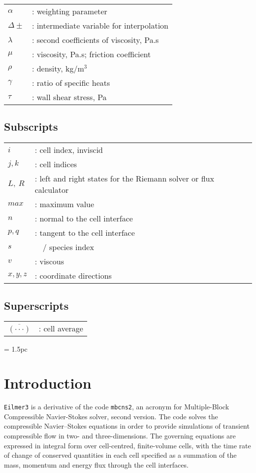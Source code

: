 \documentclass[12pt,a4paper,twoside]{article}
\begin{document}
\begin{tabular}{ll}
$\alpha$	& : weighting parameter \\
$\Delta\pm$     & : intermediate variable for interpolation \\
$\lambda$ & : second coefficients of viscosity, Pa.s \\
$\mu$		& : viscosity, Pa.s; friction coefficient \\
$\rho$         & : density, kg/m$^3$ \\
$\gamma$       & : ratio of specific heats \\
$\tau$		& : wall shear stress, Pa \\
\end{tabular}


\subsection*{Subscripts}
\begin{tabular}{ll}
$i$     & : cell index, inviscid \\
$j,k$	& : cell indices \\
$L,~R$	& : left and right states for the Riemann solver or flux calculator \\
$max$	& : maximum value \\
$n$        & : normal to the cell interface \\
$p,q$      & : tangent to the cell interface \\
$s$	& ~~/ species index \\
$v$        & : viscous \\
$x,y,z$  & : coordinate directions \\
\end{tabular}


\subsection*{Superscripts}
\begin{tabular}{ll}
$\overline{(\cdot\cdot\cdot)}$ & : cell average \\
\end{tabular}


\clearpage
\baselineskip = 1.5pc

\section{Introduction}
%
\texttt{Eilmer3} is a derivative of the code \texttt{mbcns2}, 
an acronym for Multiple-Block Compressible Navier-Stokes solver, second version.  
The code solves the compressible Navier--Stokes equations in order to provide simulations 
of transient compressible flow in two- and three-dimensions.
The governing equations are expressed in integral form over cell-centred, finite-volume cells, 
with the time rate of change of conserved quantities in each cell specified as a summation of 
the mass, momentum and energy flux through the cell interfaces.  
\end{document}
